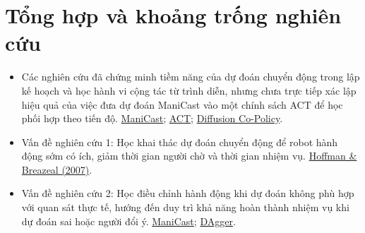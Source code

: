 \section{Tổng hợp và khoảng trống nghiên cứu}

\begin{itemize}
    \item Các nghiên cứu đã chứng minh tiềm năng của dự đoán chuyển động trong lập kế hoạch và học hành vi cộng tác từ trình diễn, nhưng chưa trực tiếp xác lập hiệu quả của việc đưa dự đoán ManiCast vào một chính sách ACT để học phối hợp theo tiến độ.
    \href{https://proceedings.mlr.press/v229/kedia23a.html}{ManiCast};
    \href{https://roboticsproceedings.org/rss19/p016.html}{ACT};
    \href{https://arxiv.org/abs/2305.12171}{Diffusion Co-Policy}.

    \item Vấn đề nghiên cứu 1: Học khai thác dự đoán chuyển động để robot hành động sớm có ích, giảm thời gian người chờ và thời gian nhiệm vụ.
    \href{https://doi.org/10.1145/1228716.1228718}{Hoffman \& Breazeal (2007)}.

    \item Vấn đề nghiên cứu 2: Học điều chỉnh hành động khi dự đoán không phù hợp với quan sát thực tế, hướng đến duy trì khả năng hoàn thành nhiệm vụ khi dự đoán sai hoặc người đổi ý.
    \href{https://proceedings.mlr.press/v229/kedia23a.html}{ManiCast};
    \href{https://proceedings.mlr.press/v15/ross11a.html}{DAgger}.
\end{itemize}
